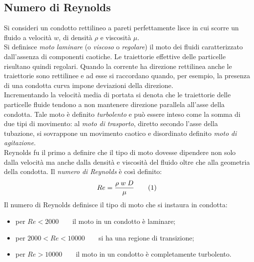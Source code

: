 \subsection{Numero di Reynolds}
Si consideri un condotto rettilineo a pareti perfettamente lisce in cui scorre un fluido a velocità \(w\), di densità \(\rho\) e viscosità \(\mu\).\\
Si definisce \textit{moto laminare} (o \textit{viscoso} o \textit{regolare}) il moto dei fluidi caratterizzato dall'assenza di componenti caotiche. Le traiettorie effettive delle particelle risultano quindi regolari. Quando la corrente ha direzione rettilinea anche le traiettorie sono rettilinee e ad esse si raccordano quando, per esempio, la presenza di una condotta curva impone deviazioni della direzione.\\
Incrementando la velocità media di portata si denota che le traiettorie delle particelle fluide tendono a non mantenere direzione parallela all'asse della condotta. Tale moto è definito \textit{turbolento} e può essere inteso come la somma di due tipi di movimento: al \textit{moto di trasporto}, diretto secondo l'asse della tubazione, si sovrappone un movimento caotico e disordinato definito \textit{moto di agitazione}.\\
Reynolds fu il primo a definire che il tipo di moto dovesse dipendere non solo dalla velocità ma anche dalla densità e viscosità del fluido oltre che alla geometria della condotta. Il \textit{numero di Reynolds} è così definito:
\[Re=\frac{\rho \; w \; D}{\mu}\addtag\label{eq:reynolds}\]
Il numero di Reynolds definisce il tipo di moto che si instaura in condotta:
\begin{itemize}
    \item per \(Re<2000\qquad\)il moto in un condotto è laminare;
    \item per \(2000<Re<10000\qquad\)si ha una regione di transizione;
    \item per \(Re>10000\qquad\)il moto in un condotto è completamente turbolento.
\end{itemize}
